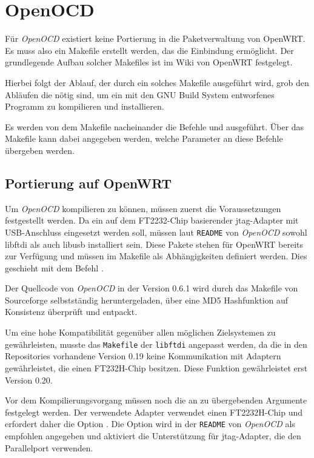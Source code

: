 \section{OpenOCD}
Für \emph{OpenOCD} existiert keine Portierung in die Paketverwaltung von OpenWRT. Es
muss also ein Makefile erstellt werden, das die Einbindung ermöglicht. Der
grundlegende Aufbau solcher Makefiles ist im Wiki von OpenWRT
festgelegt\cite{OWRT}.

Hierbei folgt der Ablauf, der durch ein solches Makefile ausgeführt wird,
grob den Abläufen die nötig sind, um ein mit den GNU Build System entworfenes
Programm zu kompilieren und installieren.

Es werden von dem Makefile nacheinander die Befehle 
und  ausgeführt. Über das Makefile kann dabei angegeben werden,
welche Parameter an diese Befehle übergeben werden.
\subsection{Portierung auf OpenWRT}
Um \emph{OpenOCD} kompilieren zu können, müssen zuerst die Voraussetzungen festgestellt
werden. Da ein auf dem FT2232-Chip basierender \gls{jtag}-Adapter mit
USB-Anschluss eingesetzt werden soll, müssen laut \texttt{README} von \emph{OpenOCD}
sowohl libftdi als auch libusb installiert sein. Diese Pakete stehen für OpenWRT
bereits zur Verfügung und müssen im Makefile als Abhängigkeiten definiert
werden. Dies geschieht mit dem Befehl .

Der Quellcode von \emph{OpenOCD} in der Version 0.6.1 wird durch das Makefile von
Sourceforge selbstständig heruntergeladen, über eine MD5 Hashfunktion auf
Konsistenz überprüft und entpackt.

Um eine hohe Kompatibilität gegenüber allen möglichen Zielsystemen zu
gewährleisten, musste das \texttt{Makefile} der \texttt{libftdi} angepasst werden, da die in den
Repositories \nopagebreak vorhandene Version 0.19  keine Kommunikation mit
Adaptern gewährleistet, die einen FT232H-Chip besitzen. Diese Funktion gewährleistet erst
Version 0.20.

Vor dem Kompilierungsvorgang müssen noch die an 
zu übergebenden Argumente festgelegt werden. Der verwendete Adapter
verwendet einen FT2232H-Chip und erfordert daher die Option
.
Die Option  wird in der \texttt{README} von \emph{OpenOCD} als
empfohlen angegeben und aktiviert die Unterstützung für \gls{jtag}-Adapter, die
den Parallelport verwenden.

